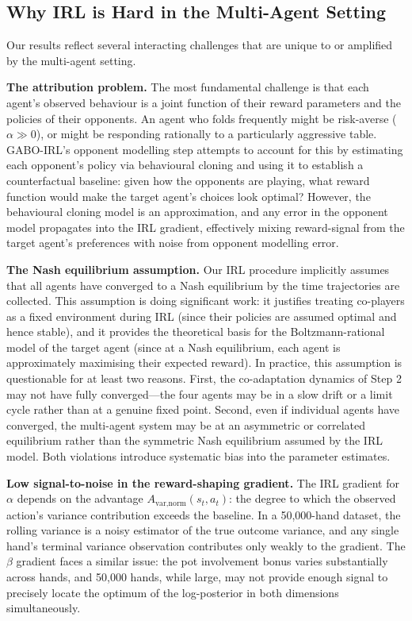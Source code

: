 \documentclass{article}
\begin{document}
\subsection{Why IRL is Hard in the Multi-Agent Setting}

Our results reflect several interacting challenges that are unique to or amplified by the multi-agent setting.

\textbf{The attribution problem.} The most fundamental challenge is that each agent's observed behaviour is a joint function of their reward parameters and the policies of their opponents. An agent who folds frequently might be risk-averse ($\alpha \gg 0$), or might be responding rationally to a particularly aggressive table. GABO-IRL's opponent modelling step attempts to account for this by estimating each opponent's policy via behavioural cloning and using it to establish a counterfactual baseline: given how the opponents are playing, what reward function would make the target agent's choices look optimal? However, the behavioural cloning model is an approximation, and any error in the opponent model propagates into the IRL gradient, effectively mixing reward-signal from the target agent's preferences with noise from opponent modelling error.

\textbf{The Nash equilibrium assumption.} Our IRL procedure implicitly assumes that all agents have converged to a Nash equilibrium by the time trajectories are collected. This assumption is doing significant work: it justifies treating co-players as a fixed environment during IRL (since their policies are assumed optimal and hence stable), and it provides the theoretical basis for the Boltzmann-rational model of the target agent (since at a Nash equilibrium, each agent is approximately maximising their expected reward). In practice, this assumption is questionable for at least two reasons. First, the co-adaptation dynamics of Step 2 may not have fully converged---the four agents may be in a slow drift or a limit cycle rather than at a genuine fixed point. Second, even if individual agents have converged, the multi-agent system may be at an asymmetric or correlated equilibrium rather than the symmetric Nash equilibrium assumed by the IRL model. Both violations introduce systematic bias into the parameter estimates.

\textbf{Low signal-to-noise in the reward-shaping gradient.} The IRL gradient for $\alpha$ depends on the advantage $A_{\text{var,norm}}(s_t, a_t)$: the degree to which the observed action's variance contribution exceeds the baseline. In a 50,000-hand dataset, the rolling variance is a noisy estimator of the true outcome variance, and any single hand's terminal variance observation contributes only weakly to the gradient. The $\beta$ gradient faces a similar issue: the pot involvement bonus varies substantially across hands, and 50,000 hands, while large, may not provide enough signal to precisely locate the optimum of the log-posterior in both dimensions simultaneously.
\end{document}
